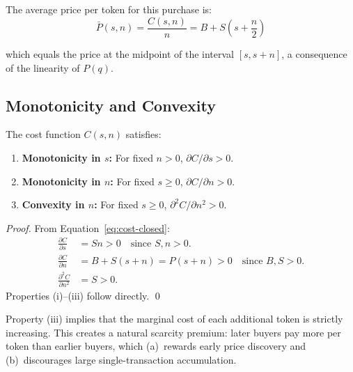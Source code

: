 The average price per token for this purchase is:
\begin{equation}
  \bar{P}(s, n) = \frac{C(s, n)}{n} = B + S\left(s + \frac{n}{2}\right)
  \label{eq:avg-price}
\end{equation}

which equals the price at the midpoint of the interval $[s, s+n]$, a
consequence of the linearity of $P(q)$.

\subsection{Monotonicity and Convexity}
\label{subsec:monotonicity}

\begin{proposition}
\label{prop:monotonicity}
The cost function $C(s, n)$ satisfies:
\begin{enumerate}
  \item[(i)] \textbf{Monotonicity in $s$:} For fixed $n > 0$,
    $\partial C / \partial s > 0$.
  \item[(ii)] \textbf{Monotonicity in $n$:} For fixed $s \geq 0$,
    $\partial C / \partial n > 0$.
  \item[(iii)] \textbf{Convexity in $n$:} For fixed $s \geq 0$,
    $\partial^2 C / \partial n^2 > 0$.
\end{enumerate}
\end{proposition}

\begin{proof}
From Equation~\eqref{eq:cost-closed}:
\begin{align}
  \frac{\partial C}{\partial s} &= Sn > 0 \quad \text{since } S, n > 0. \label{eq:dc-ds} \\
  \frac{\partial C}{\partial n} &= B + S(s + n) = P(s+n) > 0 \quad \text{since } B, S > 0. \label{eq:dc-dn} \\
  \frac{\partial^2 C}{\partial n^2} &= S > 0. \label{eq:d2c-dn2}
\end{align}
Properties (i)--(iii) follow directly. \qed
\end{proof}

\begin{remark}
Property (iii) implies that the marginal cost of each additional token is
strictly increasing. This creates a natural scarcity premium: later buyers
pay more per token than earlier buyers, which (a)~rewards early price
discovery and (b)~discourages large single-transaction accumulation.
\end{remark}

